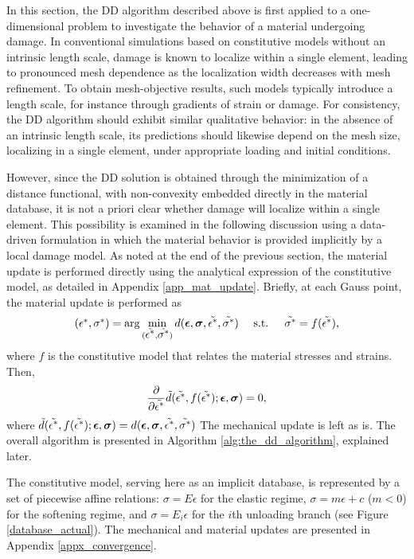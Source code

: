 \documentclass[10pt]{cas-sc}
\begin{document}
\begin{deletedblock}
	
	In this section, the DD algorithm described above is first applied to a one-dimensional problem to investigate the behavior of a material undergoing damage. In conventional simulations based on constitutive models without an intrinsic length scale, damage is known to localize within a single element, leading to pronounced mesh dependence as the localization width decreases with mesh refinement. To obtain mesh-objective results, such models typically introduce a length scale, for instance through gradients of strain or damage. For consistency, the DD algorithm should exhibit similar qualitative behavior: in the absence of an intrinsic length scale, its predictions should likewise depend on the mesh size, localizing in a single element, under appropriate loading and initial conditions.
	
	However, since the DD solution is obtained through the minimization of a distance functional, with non-convexity embedded directly in the material database, it is not a priori clear whether damage will localize within a single element. This possibility is examined in the following discussion using a data-driven formulation in which the material behavior is provided implicitly by a local damage model. As noted at the end of the previous section, the material update is performed directly using the analytical expression of the constitutive model, as detailed in Appendix \ref{app_mat_update}. Briefly, at each Gauss point, the material update is performed as
	\begin{equation}
		(\mbox{$\epsilon^*$},\mbox{$\sigma^*$}) = \arg \min_{(\tilde{\mbox{$\epsilon^*$}},\tilde{\mbox{$\sigma^*$}})} d(\mbox{\boldmath $\epsilon$},\mbox{\boldmath $\sigma$},\tilde{\mbox{$\epsilon^*$}},\tilde{\mbox{$\sigma^*$}}) \quad \text{   s.t.   }\quad \tilde{\mbox{$\sigma^*$}}=f(\tilde{\mbox{$\epsilon^*$}}),
	\end{equation}
	where $f$ is the constitutive model that relates the material stresses and strains. Then,
	\begin{equation}
		{\dfrac{\partial }{\partial \tilde{ \mbox{$\epsilon^*$}}}} \tilde{d}(\tilde{\mbox{$\epsilon^*$}},f(\tilde{\mbox{$\epsilon^*$}});\mbox{\boldmath $\epsilon$},\mbox{\boldmath $\sigma$}  )    =0,
	\end{equation}
	where $ \tilde{d}(\tilde{\mbox{$\epsilon^*$}},f(\tilde{\mbox{$\epsilon^*$}});\mbox{\boldmath $\epsilon$},\mbox{\boldmath $\sigma$} )  = d(\mbox{\boldmath $\epsilon$},\mbox{\boldmath $\sigma$},\tilde{\mbox{$\epsilon^*$}},\tilde{\mbox{$\sigma^*$}})$
	The mechanical update is left as is. The overall algorithm is presented in Algorithm \ref{alg:the_dd_algorithm}, explained later.
	
	The constitutive model, serving here as an implicit database, is represented by a set of piecewise affine relations: $\sigma = E\epsilon$ for the elastic regime, $\sigma = m\epsilon + c$ ($m<0$) for the softening regime, and $\sigma = E_i \epsilon$ for the $i$th unloading branch (see Figure \ref{database_actual}). The mechanical and material updates are presented in Appendix \ref{appx_convergence}.
	

\end{deletedblock}
\end{document}
